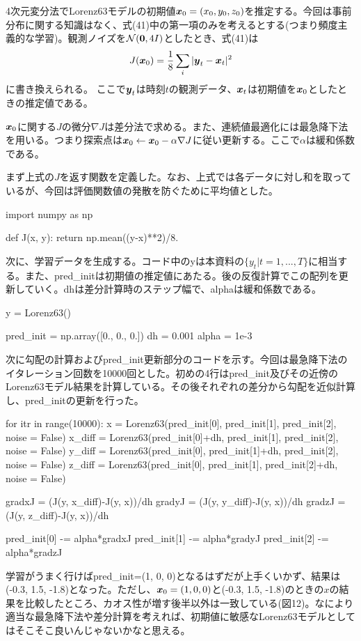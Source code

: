 \documentclass[dvipdfmx, 9pt, a4paper]{jsarticle}
\newcommand{\bm}[1]{{\mbox{\boldmath $#1$}}}
\begin{document}
4次元変分法でLorenz63モデルの初期値$\bm x_0=(x_0, y_0, z_0)$を推定する。今回は事前分布に関する知識はなく、式(41)中の第一項のみを考えるとする(つまり頻度主義的な学習)。観測ノイズを$\mathcal{N}(\bm 0, 4I)$としたとき、式(41)は
\begin{equation}
J(\bm x_{0})=\frac{1}{8}\sum_i|\bm y_t-\bm x_t|^2 \notag
\end{equation}
に書き換えられる。
ここで$\bm y_t$は時刻$t$の観測データ、$\bm x_t$は初期値を$\bm x_0$としたときの推定値である。\par
$\bm x_0$に関する$J$の微分$\nabla J$は差分法で求める。また、連続値最適化には最急降下法を用いる。つまり探索点は$\bm x_0 \leftarrow \bm x_0 - \alpha \nabla J$に従い更新する。ここで$\alpha$は緩和係数である。\par
まず上式の$J$を返す関数を定義した。なお、上式では各データに対し和を取っているが、今回は評価関数値の発散を防ぐために平均値とした。\bigskip
\begin{python}
import numpy as np

def J(x, y):
	return np.mean((y-x)**2)/8.
\end{python}\bigskip
次に、学習データを生成する。コード中のyは本資料の$\{y_t|t=1,...,T\}$に相当する。また、pred\_initは初期値の推定値にあたる。後の反復計算でこの配列を更新していく。dhは差分計算時のステップ幅で、alphaは緩和係数である。\bigskip
\begin{python}
y = Lorenz63()

pred_init = np.array([0., 0., 0.])
dh = 0.001
alpha = 1e-3
\end{python}\bigskip
次に勾配の計算およびpred\_init更新部分のコードを示す。今回は最急降下法のイタレーション回数を10000回とした。初めの4行はpred\_init及びその近傍のLorenz63モデル結果を計算している。その後それぞれの差分から勾配を近似計算し、pred\_initの更新を行った。\bigskip
\begin{python}
for itr in range(10000):
	x = Lorenz63(pred_init[0], pred_init[1], pred_init[2], noise = False)
	x_diff = Lorenz63(pred_init[0]+dh, pred_init[1], pred_init[2], noise = False)
	y_diff = Lorenz63(pred_init[0], pred_init[1]+dh, pred_init[2], noise = False)
	z_diff = Lorenz63(pred_init[0], pred_init[1], pred_init[2]+dh, noise = False)

	gradxJ = (J(y, x_diff)-J(y, x))/dh
	gradyJ = (J(y, y_diff)-J(y, x))/dh
	gradzJ = (J(y, z_diff)-J(y, x))/dh

	pred_init[0] -= alpha*gradxJ
	pred_init[1] -= alpha*gradyJ
	pred_init[2] -= alpha*gradzJ
\end{python}\bigskip
学習がうまく行けばpred\_init=(1, 0, 0)となるはずだが上手くいかず、結果は(-0.3, 1.5, -1.8)となった。ただし、$\bm x_0=(1, 0, 0)$と(-0.3, 1.5, -1.8)のときの$x$の結果を比較したところ、カオス性が増す後半以外は一致している(図12)。なにより適当な最急降下法や差分計算を考えれば、初期値に敏感なLorenz63モデルとしてはそこそこ良いんじゃないかなと思える。\par
\end{document}
